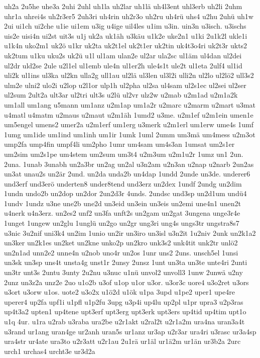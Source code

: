 {uh2a
2u5he
uhe3a
2uhi
2uhl
uh1la
uh2lar
uh1lä
uh4l3ent
uhl3erb
uh2li
2uhm
uhr1a
uhrei4s
uh2r3er5
2uh3ri
uh4rin
uh2r3o
uh2ru
uh4rü
uhs4
u2hu
2uhü
uh1w
2ui
ui1ch
ui2che
u1ie
ui1em
u3ig
u4ige
uil4les
u1im
u3in.
uin3n
u3isch.
u3ischs
uis2e
uisi4n
ui2st
uit3s
u1j
uk2a
uk1äh
u3käu
u1k2e
uke2n1
u1ki
2u1k2l
ukle1i
u1k4n
uko2m1
uk2ö
u1kr
uk2ta
uk2t1el
uk2t1er
uk2tin
uk4t3o4ri
uk2t3r
ukts2
uk2tum
u1ku
uku2s
uk2ü
u1l
ul1am
ulan2e
ul2ar
ula2sc
ul1äm
ul4dan
ul2dei
ul2dr
uld2se
2ule
u2l1el
ul1emb
ule4n
ul1er2h
ule4s1t
ule2t
ul1eta
2ulf4
ul1id
uli2k
ul1ins
ul3ka
ul2kn
ulla2g
ull1au
ul2lä
ul3len
ul3l2i
ulli2n
ul2lo
ul2lö2
ull3s2
ulm2e
ulni2
ulo2i
u2lop
u2l1or
ulp1h
ul2pha
ul2sa
ul4sam
ul2s1ec
ul2sei
ul2ser
ul2sum
2ult2a
ult3ar
ul2tri
ult3s
u2lü
ul2vr
ulz2w
u2mab
u2m1ad
u2m1a2k
um1all
um1ang
u5mann
um1anz
u2m1ap
um1a2r
u2marc
u2marm
u2mart
u3mat
u4matl
u4matm
u2maus
u2maut
u2m1äh
1umd2
u3me.
u2m1ef
u2m1ein
umen1e
um5engel
umens2
umer2a
u2m1erf
um1erg
u3merk
u2m1erl
um1erw
ume4s
1umf
1umg
um1ide
um1ind
um1inh
um1ir
1umk
1uml
2umm
um3mä
um4mess
u2m3ot
ump2fa
ump4fin
umpf4li
um2pho
1umr
um4sam
um4s3an
1umsat
um2s1er
um2sim
um2s1pe
um4stem
um2sum
um3t4
u2m3um
u2m1u2r
1umz
un1
2un.
2una.
1unab
3unabh
un2a3br
un2ag
un2al
u3n2am
u2n3an
u2nap
u2narb
2un2as
un3at
unau2s
un2är
2und.
un2da
unda2b
un4dap
1undd
2unde
un3de.
underer6
und3erf
und3erö
underten8
under8tend
und3erz
un2dex
1undf
2undg
un2dim
1undn
undo2b
un2dop
un2dor
2un2d3r
4unds.
2undsc
und3sp
un2d1um
undü4
1undv
1undz
u3ne
une2b
une2d
un3eid
un3ein
un3eis
un2emi
une4n1
unen2t
u4nerk
u4n3erz.
un2es2
unf2
un3fa
unft2s
un2gam
un2gat
3ungena
unge3r4e
1unget
1ungew
un2glu
1unglü
un2go
un2gr
ung3ri
ung4s
ungs3tr
ungstra8s7
u3nic
3u2nif
uni3k4
un2im
1unio
un2ir
un3iro
un3isl
u3n2it
1u2niv
2unk
un2k1a2
un3ker
un2k1es
un2ket
un2kne
unko2p
un2kro
unk3s2
unk4tit
unk2tr
unlö2
un2n1ad
unn2e2
unne4n
u2nob
uno4r
un2os
1unr
uns2
2uns.
unsch5el
1unsi
un3sk
un3sp
uns4t
unsta4g
unst1r
2unsy
2unsz
1unt
un3ta
un3te
unte4ri
2unti
un3tr
unt3s
2untu
3unty
2u2nu
u3nuc
u1nü
unvol2
unvoll3
1unw
2unwä
u2ny
2unz
un3z2a
unz2e
2uo
u1o2b
u3of
u1op
u1or
u3or.
u3or3c
uore4
u3o2ret
u3ors
u3ort
u3orw
u1os.
uote2
u3o2x
u1ö2d
u1ök
u1pa
3upd
u1pe2
uper1
upe4re
uperer4
up2fa
upf1i
u1pfl
u1p2fu
3upg
u3p4i
up4lu
up2pl
u1pr
upra3
u2p3ras
up4t3a2
upten1
up4tene
upt3erf
upt3erg
upt3erk
upt3ers
up4tid
up4tim
upt1o
u1q
4ur.
u1ra
u2rab
u3raba
ura2be
u2r1akt
u2ral2t
u2r1a2m
ura4na
uran3a4t
u3rand
ur1ang
uran4ge
ur2anh
uran5s
ur1anz
ur3ap
u2r3ar
ura4ri
u3rasc
ur3a4sp
ura4str
ur4ate
ura3to
u2r3att
u2r1au
2u1rä
ur1äl
ur1ä2m
ur1än
ur3b2a
2urc
urch1
urchas4
urcht3e
ur3d2a
}
